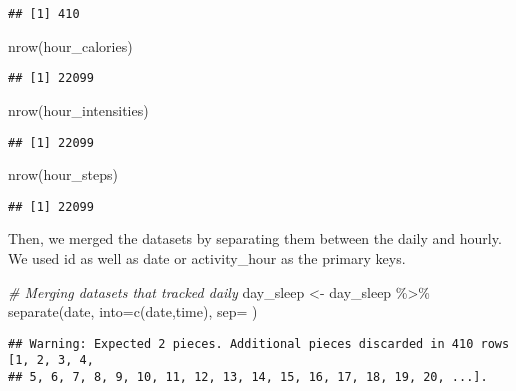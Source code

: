 \documentclass[
]{article}
\newenvironment{Shaded}{\begin{snugshade}}{\end{snugshade}}
\newcommand{\AttributeTok}[1]{\textcolor[rgb]{0.77,0.63,0.00}{#1}}
\newcommand{\CommentTok}[1]{\textcolor[rgb]{0.56,0.35,0.01}{\textit{#1}}}
\newcommand{\FunctionTok}[1]{\textcolor[rgb]{0.00,0.00,0.00}{#1}}
\newcommand{\NormalTok}[1]{#1}
\newcommand{\OtherTok}[1]{\textcolor[rgb]{0.56,0.35,0.01}{#1}}
\newcommand{\SpecialCharTok}[1]{\textcolor[rgb]{0.00,0.00,0.00}{#1}}
\newcommand{\StringTok}[1]{\textcolor[rgb]{0.31,0.60,0.02}{#1}}
\begin{document}
\begin{verbatim}
## [1] 410
\end{verbatim}

\begin{Shaded}
\begin{Highlighting}[]
\FunctionTok{nrow}\NormalTok{(hour\_calories)}
\end{Highlighting}
\end{Shaded}

\begin{verbatim}
## [1] 22099
\end{verbatim}

\begin{Shaded}
\begin{Highlighting}[]
\FunctionTok{nrow}\NormalTok{(hour\_intensities)}
\end{Highlighting}
\end{Shaded}

\begin{verbatim}
## [1] 22099
\end{verbatim}

\begin{Shaded}
\begin{Highlighting}[]
\FunctionTok{nrow}\NormalTok{(hour\_steps)}
\end{Highlighting}
\end{Shaded}

\begin{verbatim}
## [1] 22099
\end{verbatim}

Then, we merged the datasets by separating them between the daily and
hourly. We used id as well as date or activity\_hour as the primary
keys.

\begin{Shaded}
\begin{Highlighting}[]
\CommentTok{\# Merging datasets that tracked daily}
\NormalTok{day\_sleep }\OtherTok{\textless{}{-}}\NormalTok{ day\_sleep }\SpecialCharTok{\%\textgreater{}\%}
  \FunctionTok{separate}\NormalTok{(date, }\AttributeTok{into=}\FunctionTok{c}\NormalTok{(}\StringTok{\textquotesingle{}date\textquotesingle{}}\NormalTok{,}\StringTok{\textquotesingle{}time\textquotesingle{}}\NormalTok{), }\AttributeTok{sep=}\StringTok{\textquotesingle{} \textquotesingle{}}\NormalTok{)}
\end{Highlighting}
\end{Shaded}

\begin{verbatim}
## Warning: Expected 2 pieces. Additional pieces discarded in 410 rows [1, 2, 3, 4,
## 5, 6, 7, 8, 9, 10, 11, 12, 13, 14, 15, 16, 17, 18, 19, 20, ...].
\end{verbatim}
\end{document}

